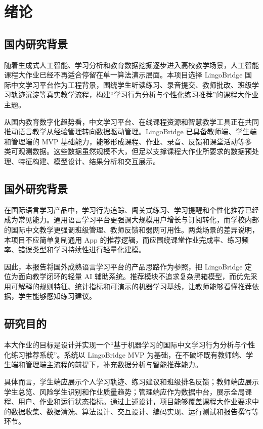 
\chapter{绪论}
\section{国内研究背景}

随着生成式人工智能、学习分析和教育数据挖掘逐步进入高校教学场景，人工智能课程大作业已经不再适合停留在单一算法演示层面。本项目选择 LingoBridge 国际中文学习平台作为工程背景，围绕学生听读练习、录音提交、教师批改、班级学习轨迹沉淀等真实教学流程，构建“学习行为分析与个性化练习推荐”的课程大作业主题。

从国内教育数字化趋势看，中文学习平台、在线课程资源和智慧教学工具正在共同推动语言教学从经验管理转向数据驱动管理。LingoBridge 已具备教师端、学生端和管理端的 MVP 基础能力，能够形成课程、作业、录音、反馈和课堂活动等多类可观测数据。这些数据虽然规模不大，但足以支撑课程大作业所要求的数据预处理、特征构建、模型设计、结果分析和交互展示。

\section{国外研究背景}

在国际语言学习产品中，学习行为追踪、闯关式练习、学习提醒和个性化推荐已经成为常见能力。通用语言学习平台更强调大规模用户增长与订阅转化，而学校内部的国际中文教学更强调班级管理、教师反馈和弱网可用性。两类场景的差异说明，本项目不应简单复制通用 App 的推荐逻辑，而应围绕课堂作业完成率、练习频率、错误类型和学习持续性进行轻量化建模。

因此，本报告将国外成熟语言学习平台的产品思路作为参照，把 LingoBridge 定位为面向教学闭环的轻量 AI 辅助系统。推荐模块不追求复杂黑箱模型，而优先采用可解释的规则特征、统计指标和可演示的机器学习基线，让教师能够看懂推荐依据，学生能够感知练习建议。

\section{研究目的}

本大作业的目标是设计并实现一个“基于机器学习的国际中文学习行为分析与个性化练习推荐系统”。系统以 LingoBridge MVP 为基础，在不破坏既有教师端、学生端和管理端主流程的前提下，补充数据分析与智能推荐能力。

具体而言，学生端应展示个人学习轨迹、练习建议和班级排名反馈；教师端应展示学生总览、风险学生识别和作业质量趋势；管理端应作为数据中台，展示全局课程、用户、作业和运行状态指标。通过上述设计，项目能够覆盖课程大作业要求中的数据收集、数据清洗、算法设计、交互设计、编码实现、运行测试和报告撰写等环节。
